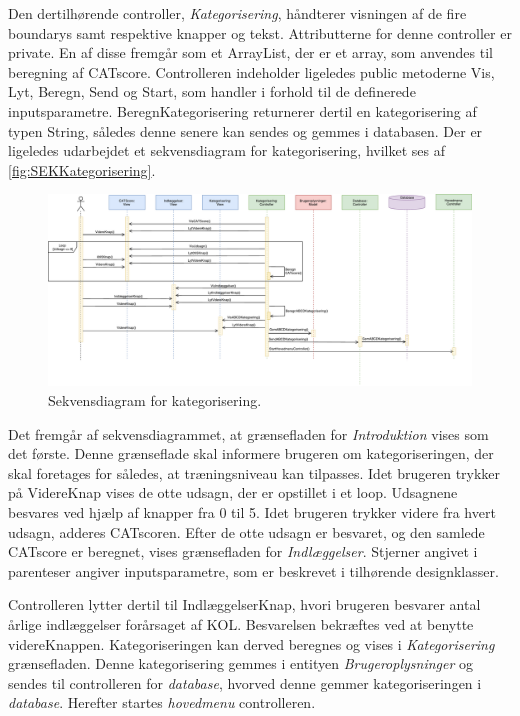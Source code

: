 Den dertilhørende controller, \textit{Kategorisering}, håndterer visningen af de fire boundarys samt respektive knapper og tekst. Attributterne for denne controller er private. En af disse fremgår som et ArrayList, der er et array, som anvendes til beregning af CATscore. Controlleren indeholder ligeledes public metoderne Vis, Lyt, Beregn, Send og Start, som handler i forhold til de definerede inputsparametre. BeregnKategorisering returnerer dertil en kategorisering af typen String, således denne senere kan sendes og gemmes i databasen. Der er ligeledes udarbejdet et sekvensdiagram for kategorisering, hvilket ses af \autoref{fig:SEKKategorisering}.

\begin{figure} [H]
\centering
\includegraphics[width=1.55\textwidth, angle=90]{figures/Sek/SEKKategorisering}
\caption{Sekvensdiagram for kategorisering.}
\label{fig:SEKKategorisering}
\end{figure}

\noindent
Det fremgår af sekvensdiagrammet, at grænsefladen for \textit{Introduktion} vises som det første. Denne grænseflade skal informere brugeren om kategoriseringen, der skal foretages for således, at træningsniveau kan tilpasses. Idet brugeren trykker på VidereKnap vises de otte udsagn, der er opstillet i et loop. Udsagnene besvares ved hjælp af knapper fra 0 til 5. Idet brugeren trykker videre fra hvert udsagn, adderes CATscoren. Efter de otte udsagn er besvaret, og den samlede CATscore er beregnet, vises grænsefladen for \textit{Indlæggelser}. Stjerner angivet i parenteser angiver inputsparametre, som er beskrevet i tilhørende designklasser.


Controlleren lytter dertil til IndlæggelserKnap, hvori brugeren besvarer antal årlige indlæggelser forårsaget af KOL. Besvarelsen bekræftes ved at benytte videreKnappen. Kategoriseringen kan derved beregnes og vises i \textit{Kategorisering} grænsefladen. Denne kategorisering gemmes i entityen \textit{Brugeroplysninger} og sendes til controlleren for \textit{database}, hvorved denne gemmer kategoriseringen i \textit{database}. Herefter startes \textit{hovedmenu} controlleren. 
